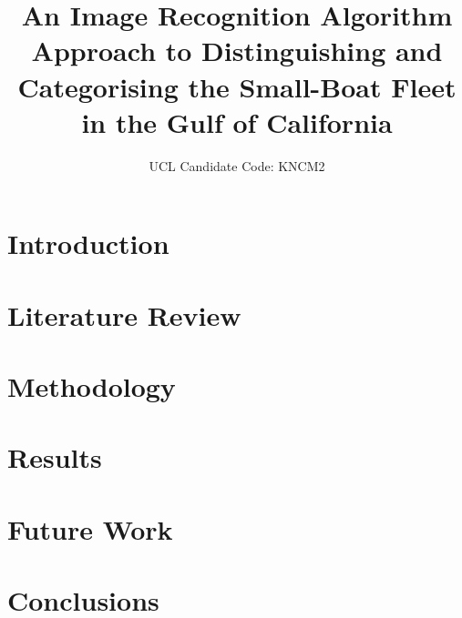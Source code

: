 \documentclass[12pt]{report}
\begin{document}
\vspace*{-5cm}
\hspace*{-1.35cm}
\vfill %

\title{An Image Recognition Algorithm Approach to Distinguishing and Categorising the Small-Boat Fleet in the Gulf of California}
\author{UCL Candidate Code: KNCM2}

\beforepreface


\afterpreface
\hypersetup{linkcolor=magenta}


\chapter{Introduction}
\label{chap:1}



\chapter{Literature Review}
\label{chap:2}


\chapter{Methodology}
\label{chap:3}


\chapter{Results}
\label{chap:4}


\chapter{Future Work}
\label{chap:5}


\chapter{Conclusions}
\label{chap:6}




\end{document}
